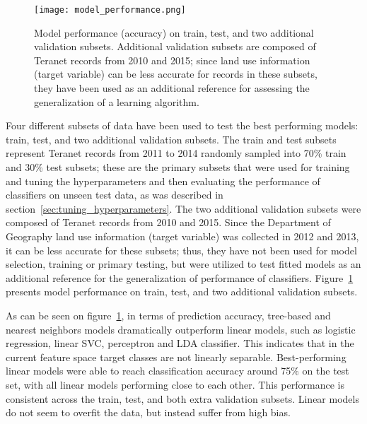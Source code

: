 \begin{figure}[hbt!]
    \centering
    \texttt{[image: model\_performance.png]}
    \caption{Model performance (accuracy) on train, test, and two additional validation subsets.
    Additional validation subsets are composed of Teranet records from 2010 and 2015;
    since land use information (target variable) can be less accurate for records in these subsets, they have been used as an additional reference for assessing the generalization of a learning algorithm.}
    \label{fig:model_performance}
\end{figure}

Four different subsets of data have been used to test the best performing models: train, test, and two additional validation subsets.
The train and test subsets represent Teranet records from 2011 to 2014 randomly sampled into 70\% train and 30\% test subsets;
these are the primary subsets that were used for training and tuning the hyperparameters and then evaluating the performance of classifiers on unseen test data, as was described in section~\ref{sec:tuning_hyperparameters}.
The two additional validation subsets were composed of Teranet records from 2010 and 2015.
Since the Department of Geography land use information (target variable) was collected in 2012 and 2013, it can be less accurate for these subsets;
thus, they have not been used for model selection, training or primary testing, but were utilized to test fitted models as an additional reference for the generalization of performance of classifiers.
Figure~\ref{fig:model_performance} presents model performance on train, test, and two additional validation subsets.

As can be seen on figure~\ref{fig:model_performance}, in terms of prediction accuracy, tree-based and nearest neighbors models dramatically outperform linear models, such as logistic regression, linear SVC, perceptron and LDA classifier.
This indicates that in the current feature space target classes are not linearly separable.
Best-performing linear models were able to reach classification accuracy around 75\% on the test set, with all linear models performing close to each other.
This performance is consistent across the train, test, and both extra validation subsets.
Linear models do not seem to overfit the data, but instead suffer from high bias.

